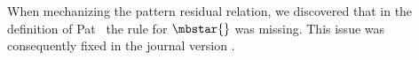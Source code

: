 When mechanizing the pattern residual relation, we discovered that in the
definition of Pat~\cite{fowlerSpecialDeliveryProgramming2023} the rule for
$\mbstar{}$ was missing.  This issue was consequently fixed in the journal
version \cite{fowlerSpecialDeliveryProgramming2025}.

